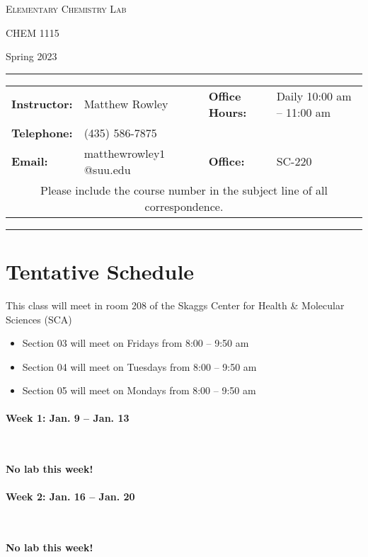 \documentclass[12pt, letterpaper]{article}
\begin{document}
\begin{center}
	{\Large \textsc{Elementary Chemistry Lab}}

	CHEM 1115
\end{center}

\begin{center}
	{\large Spring 2023}
\end{center}
\begin{center}
	\rule{0.99\textwidth}{0.4pt}
	\begin{tabular}{llcll}
		\textbf{Instructor:} & Matthew Rowley           &  & \textbf{Office Hours:} & Daily 10:00 am -- 11:00 am \\
		\textbf{Telephone:}  & (435) 586-7875           &  &                        &                            \\
		\textbf{Email:}      & matthewrowley$1$@suu.edu &  & \textbf{Office:}       & SC-220                     \\
		\multicolumn{5}{c}{Please include the course number in the subject line of all correspondence.}
	\end{tabular}
	\rule{0.99\textwidth}{0.4pt}
\end{center}

\section*{Tentative Schedule}
This class will meet in room 208 of the Skaggs Center for Health \& Molecular Sciences (SCA)
\begin{itemize}
	\item Section 03 will meet on Fridays from 8:00 – 9:50 am
	\item Section 04 will meet on Tuesdays from 8:00 – 9:50 am
	\item Section 05 will meet on Mondays from 8:00 – 9:50 am
\end{itemize}

\paragraph{Week 1: Jan. 9 -- Jan. 13}~

\textbf{No lab this week!}

\paragraph{Week 2: Jan. 16 -- Jan. 20}~

\textbf{No lab this week!}
\end{document}
